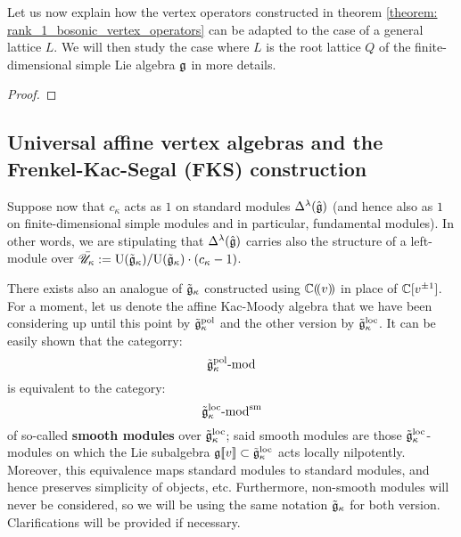         Let us now explain how the vertex operators constructed in theorem \ref{theorem: rank_1_bosonic_vertex_operators} can be adapted to the case of a general lattice $L$. We will then study the case where $L$ is the root lattice $Q$ of the finite-dimensional simple Lie algebra $\mathfrak{g}$ in more details.

        \begin{theorem} \label{theorem: bosonic_vertex_operators}
            
        \end{theorem}
            \begin{proof}
                
            \end{proof}

    \subsection{Universal affine vertex algebras and the Frenkel-Kac-Segal (FKS) construction}
        \begin{convention}
            Suppose now that $c_{\kappa}$ acts as $1$ on standard modules $\Delta^{\lambda}(\hat{\mathfrak{g}})$ (and hence also as $1$ on finite-dimensional simple modules and in particular, fundamental modules). In other words, we are stipulating that $\Delta^{\lambda}(\hat{\mathfrak{g}})$ carries also the structure of a left-module over $\bar{\mathscr{U}}_{\kappa} := \mathrm{U}(\tilde{\mathfrak{g}}_{\kappa})/\mathrm{U}(\tilde{\mathfrak{g}}_{\kappa}) \cdot (c_{\kappa} - 1)$.
        \end{convention}

        \begin{remark}
            There exists also an analogue of $\tilde{\mathfrak{g}}_{\kappa}$ constructed using $\mathbb{C}(\!(v)\!)$ in place of $\mathbb{C}[v^{\pm 1}]$. For a moment, let us denote the affine Kac-Moody algebra that we have been considering up until this point by $\tilde{\mathfrak{g}}_{\kappa}^{\mathrm{pol}}$ and the other version by $\tilde{\mathfrak{g}}_{\kappa}^{\mathrm{loc}}$. It can be easily shown that the categorry:
                $$\tilde{\mathfrak{g}}_{\kappa}^{\mathrm{pol}}\text{-}\mathrm{mod}$$
            is equivalent to the category:
                $$\tilde{\mathfrak{g}}_{\kappa}^{\mathrm{loc}}\text{-}\mathrm{mod}^{\mathrm{sm}}$$
            of so-called \textbf{smooth modules} over $\tilde{\mathfrak{g}}_{\kappa}^{\mathrm{loc}}$; said smooth modules are those $\tilde{\mathfrak{g}}_{\kappa}^{\mathrm{loc}}$-modules on which the Lie subalgebra $\mathfrak{g}[\![v]\!] \subset \tilde{\mathfrak{g}}_{\kappa}^{\mathrm{loc}}$ acts locally nilpotently. Moreover, this equivalence maps standard modules to standard modules, and hence preserves simplicity of objects, etc. Furthermore, non-smooth modules will never be considered, so we will be using the same notation $\tilde{\mathfrak{g}}_{\kappa}$ for both version. Clarifications will be provided if necessary.
        \end{remark}

